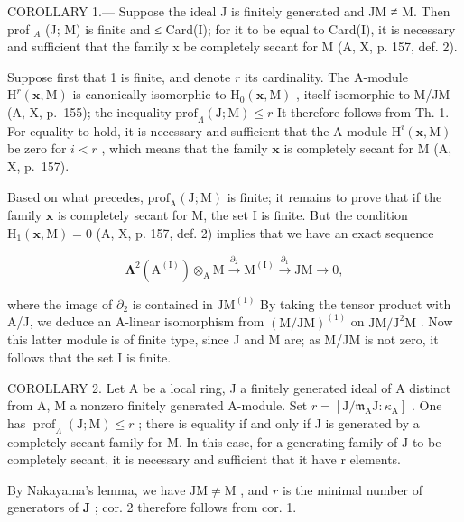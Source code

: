 COROLLARY 1.--- Suppose the ideal J is finitely generated and JM ≠ M. Then prof \(_{A}\) (J; M) is finite and ≤ Card(I); for it to be equal to Card(I), it is necessary and sufficient that the family x be completely secant for M (A, X, p. 157, def. 2).

Suppose first that 1 is finite, and denote \(r\) its cardinality. The A-module \(\mathrm{H}^r (\mathbf{x},\mathrm{M})\) is canonically isomorphic to \(\mathrm{H}_0(\mathbf{x},\mathrm{M})\) , itself isomorphic to M/JM (A, X, p.~155); the inequality \(\mathrm{prof}_{\Lambda}(\mathrm{J};\mathrm{M})\leqslant r\) It therefore follows from Th. 1. For equality to hold, it is necessary and sufficient that the A-module \(\mathrm{H}^i (\mathbf{x},\mathrm{M})\) be zero for \(i < r\) , which means that the family \(\mathbf{x}\) is completely secant for M (A, X, p.~157).

Based on what precedes, \(\mathrm{prof}_{\mathrm{A}}(\mathrm{J};\mathrm{M})\) is finite; it remains to prove that if the family \(\mathbf{x}\) is completely secant for M, the set I is finite. But the condition \(\mathrm{H}_{1}(\mathbf{x},\mathrm{M}) = 0\) (A, X, p. 157, def. 2) implies that we have an exact sequence

\[
\boldsymbol {\Lambda} ^ {2} (\mathrm{A} ^ {(\mathrm{I})}) \otimes_ {\mathrm{A}} \mathrm{M} \xrightarrow {\partial_ {2}} \mathrm{M} ^ {(\mathrm{I})} \xrightarrow {\partial_ {1}} \mathrm{JM} \to 0,
\]

where the image of \(\partial_{2}\) is contained in \(\mathrm{JM}^{(1)}\) By taking the tensor product with A/J, we deduce an A-linear isomorphism from \((\mathrm{M} / \mathrm{JM})^{(1)}\) on \(\mathrm{JM} / \mathrm{J}^2\mathrm{M}\) . Now this latter module is of finite type, since J and M are; as M/JM is not zero, it follows that the set I is finite.

COROLLARY 2. Let A be a local ring, J a finitely generated ideal of A distinct from A, M a nonzero finitely generated A-module. Set \(r = [\mathrm{J} / \mathfrak{m}_{\mathrm{A}}\mathrm{J} : \kappa_{\mathrm{A}}]\) . One has \(\operatorname{prof}_{\Lambda}(\mathrm{J};\mathrm{M}) \leqslant r\) ; there is equality if and only if J is generated by a completely secant family for M. In this case, for a generating family of J to be completely secant, it is necessary and sufficient that it have r elements.

By Nakayama's lemma, we have \(\mathrm{JM} \neq \mathrm{M}\) , and \(r\) is the minimal number of generators of \(\mathbf{J}\) ; cor. 2 therefore follows from cor. 1.

